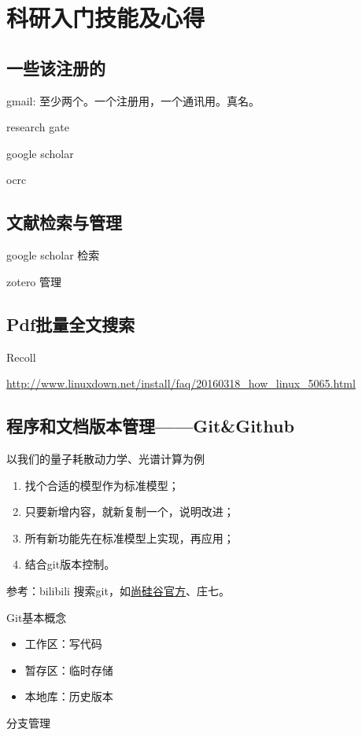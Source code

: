 \documentclass[a4paper,11pt,twoside]{book}
\begin{document}
\chapter{科研入门技能及心得}
\section{一些该注册的}
gmail: 至少两个。一个注册用，一个通讯用。真名。

research gate

google scholar

ocrc

\section{文献检索与管理}
google scholar 检索

zotero 管理

\section{Pdf批量全文搜索}
Recoll

\url{http://www.linuxdown.net/install/faq/20160318_how_linux_5065.html}



\section{程序和文档版本管理——Git\&Github}
以我们的量子耗散动力学、光谱计算为例
\begin{enumerate}
\item 找个合适的模型作为标准模型；
\item 只要新增内容，就新复制一个，说明改进；
\item 所有新功能先在标准模型上实现，再应用；
\item 结合git版本控制。
\end{enumerate}


参考：bilibili 搜索git，如\underline{尚硅谷官方}、庄七。

Git基本概念
\begin{itemize}
\item 工作区：写代码
\item 暂存区：临时存储
\item 本地库：历史版本
\end{itemize}

分支管理
\end{document}

